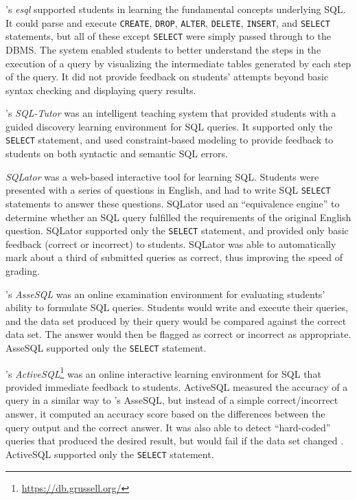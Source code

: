 \documentclass[sigconf, authordraft, capitalise]{acmart}
\begin{document}
\citeauthor{Kearns.R-1997a-A-teaching}'s \emph{esql} \cite{Kearns.R-1997a-A-teaching} supported students in learning the fundamental concepts underlying SQL. It could parse and execute \texttt{CREATE}, \texttt{DROP}, \texttt{ALTER}, \texttt{DELETE}, \texttt{INSERT}, and \texttt{SELECT} statements, but all of these except \texttt{SELECT} were simply passed through to the DBMS. The system enabled students to better understand the steps in the execution of a query by visualizing the intermediate tables generated by each step of the query. It did not provide feedback on students' attempts beyond basic syntax checking and displaying query results.

\citeauthor{Mitrovic.A-1998a-Learning}'s \emph{SQL-Tutor} \cite{Mitrovic.A-1998a-Learning} was an intelligent teaching system  that provided students with a guided discovery learning environment for SQL queries. It supported only the \texttt{SELECT} statement, and used constraint-based modeling \cite{Ohlsson.S-1992a-Constraint-based,Ohlsson.S-2016a-Constraint-based} to provide feedback to students on both syntactic and semantic SQL errors.

\citeauthor{Sadiq.S-2004a-SQLator} \emph{SQLator} \cite{Sadiq.S-2004a-SQLator} was a web-based interactive tool for learning SQL. Students were presented with a series of questions in English, and had to write SQL \texttt{SELECT} statements to answer these questions. SQLator used an ``equivalence engine'' to determine whether an SQL query fulfilled the requirements of the original English question. SQLator supported only the \texttt{SELECT} statement, and provided only basic feedback (correct or incorrect) to students. SQLator was able to automatically mark about a third of submitted queries as correct, thus improving the speed of grading. 

\citeauthor{Prior.J-2004a-Backwash}'s \emph{AsseSQL} \cite{Prior.J-2004a-Backwash} was an online examination environment for evaluating students' ability to formulate SQL queries. Students would write and execute their queries, and the data set produced by their query would be compared against the correct data set. The answer would then be flagged as correct or incorrect as appropriate. AsseSQL supported only the \texttt{SELECT} statement.

\citeauthor{Russell.G-2004a-Improving}'s \emph{ActiveSQL}\footnote{\url{https://db.grussell.org/}} \cite{Russell.G-2004a-Improving,Russell.G-2005a-Online} was an online interactive learning environment for SQL that provided immediate feedback to students. ActiveSQL measured the accuracy of a query in a similar way to \citeauthor{Prior.J-2004a-Backwash}'s AsseSQL, but instead of a simple correct/incorrect answer, it computed an accuracy score based on the differences between the query output and the correct answer. It was also able to detect ``hard-coded'' queries that produced the desired result, but would fail if the data set changed \cite{Russell.G-2005a-Online}. ActiveSQL supported only the \texttt{SELECT} statement.
\end{document}
